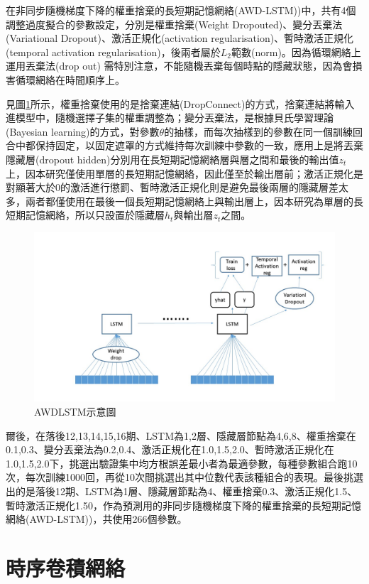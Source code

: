 \documentclass[oneside]{book}
\begin{document}
在非同步隨機梯度下降的權重捨棄的長短期記憶網絡(AWD-LSTM))中，共有4個調整過度擬合的參數設定，分別是權重捨棄(Weight Dropouted)、變分丟棄法(Variational Dropout)、激活正規化(activation regularisation)、暫時激活正規化(temporal activation regularisation)，後兩者屬於\(L_2\)範數(norm)。因為循環網絡上運用丟棄法(drop out) 需特別注意，不能隨機丟棄每個時點的隱藏狀態，因為會損害循環網絡在時間順序上。

見圖\ref{fig:LSTMmodel}所示，權重捨棄使用的是捨棄連結(DropConnect)的方式，捨棄連結將輸入進模型中，隨機選擇子集的權重調整為；變分丟棄法，是根據貝氏學習理論(Bayesian learning)的方式，對參數\(\theta\)的抽樣，而每次抽樣到的參數在同一個訓練回合中都保持固定，以固定遮罩的方式維持每次訓練中參數的一致，應用上是將丟棄隱藏層(dropout hidden)分別用在長短期記憶網絡層與層之間和最後的輸出值\(z_t\)上，因本研究僅使用單層的長短期記憶網絡，因此僅至於輸出層前；激活正規化是對顯著大於0的激活進行懲罰、暫時激活正規化則是避免最後兩層的隱藏層差太多，兩者都僅使用在最後一個長短期記憶網絡上與輸出層上，因本研究為單層的長短期記憶網絡，所以只設置於隱藏層\(h_t\)與輸出層\(z_t\)之間。

\begin{figure}

{\centering \includegraphics[width=.6\linewidth]{./fig/LSTM_model} 

}

\caption{AWDLSTM示意圖}\label{fig:LSTMmodel}
\end{figure}

爾後，在落後12,13,14,15,16期、LSTM為1,2層、隱藏層節點為4,6,8、權重捨棄在0.1,0.3、變分丟棄法為0.2,0.4、激活正規化在1.0,1.5,2.0、暫時激活正規化在1.0,1.5,2.0下，挑選出驗證集中均方根誤差最小者為最適參數，每種參數組合跑10次，每次訓練1000回，再從10次間挑選出其中位數代表該種組合的表現。最後挑選出的是落後12期、LSTM為1層、隱藏層節點為4、權重捨棄0.3、激活正規化1.5、暫時激活正規化1.50，作為預測用的非同步隨機梯度下降的權重捨棄的長短期記憶網絡(AWD-LSTM))，共使用266個參數。

\hypertarget{ux6642ux5e8fux5377ux7a4dux7db2ux7d61}{%
\section{時序卷積網絡}\label{ux6642ux5e8fux5377ux7a4dux7db2ux7d61}}
\end{document}
